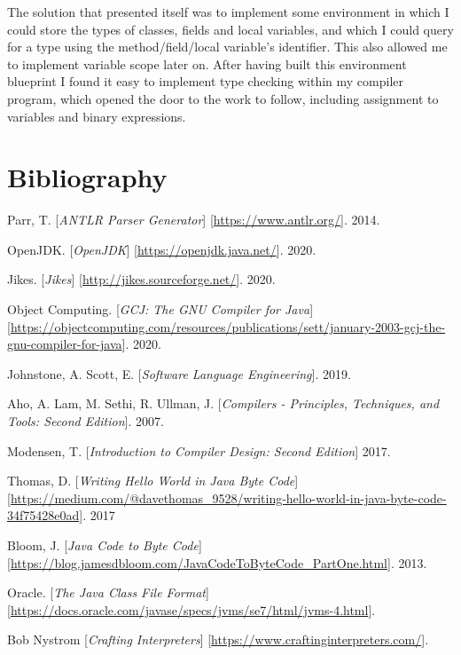 \documentclass[a4paper, 11pt]{article}
\begin{document}
The solution that presented itself was to implement some environment in which I could store the types of classes, fields and local variables, and which I could query for a type using the method/field/local variable's identifier. This also allowed me to implement variable scope later on. After having built this environment blueprint I found it easy to implement type checking within my compiler program, which opened the door to the work to follow, including assignment to variables and binary expressions.

\newpage\part{Bibliography}
\begin{thebibliography}{9}

Parr, T. [\textit{ANTLR Parser Generator}] [\url{https://www.antlr.org/}]. 2014.

OpenJDK. [\textit{OpenJDK}] [\url{https://openjdk.java.net/}]. 2020.

Jikes. [\textit{Jikes}] [\url{http://jikes.sourceforge.net/}]. 2020.

Object Computing. [\textit{GCJ: The GNU Compiler for Java}] [\url{https://objectcomputing.com/resources/publications/sett/january-2003-gcj-the-gnu-compiler-for-java}]. 2020.

Johnstone, A. Scott, E. [\textit{Software Language Engineering}]. 2019. 

Aho, A. Lam, M. Sethi, R. Ullman, J.
[\textit{Compilers - Principles, Techniques, and Tools: Second Edition}]. 
2007.

Modensen, T. [\textit{Introduction to Compiler Design: Second Edition}] 2017.

Thomas, D. [\textit{Writing Hello World in Java Byte Code}] [\url{https://medium.com/@davethomas_9528/writing-hello-world-in-java-byte-code-34f75428e0ad}]. 2017

Bloom, J. [\textit{Java Code to Byte Code}] [\url{https://blog.jamesdbloom.com/JavaCodeToByteCode_PartOne.html}]. 2013.

Oracle. [\textit{The Java Class File Format}] [\url{https://docs.oracle.com/javase/specs/jvms/se7/html/jvms-4.html}]. 

Bob Nystrom [\textit{Crafting Interpreters}] [\url{https://www.craftinginterpreters.com/}]. 


\end{thebibliography}
\end{document}
